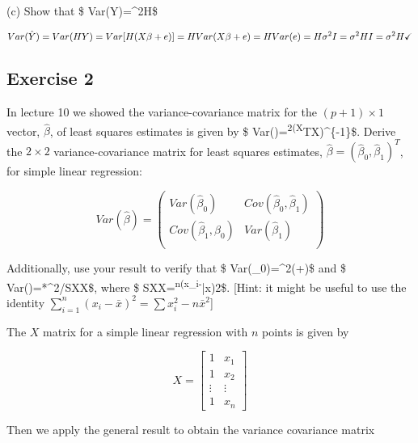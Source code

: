 \documentclass[
  letterpaper,
  DIV=11,
  numbers=noendperiod]{scrartcl}
\begin{document}
(c) Show that \$ Var(\hat Y)=\sigma\^{}2H\$

\[
 Var(\hat Y)= Var(HY)= Var[H(X\beta+e)] \\
=H  Var(X\beta+e) \\
=H  Var(e)\\
=H\sigma^2I \\
=\sigma^2HI \\
=\sigma^2H \checkmark
\]

\hypertarget{exercise-2}{%
\subsection{Exercise 2}\label{exercise-2}}

In lecture 10 we showed the variance-covariance matrix for the
\((p+1)\times1\) vector, \(\hat \beta\), of least squares estimates is
given by \$ Var(\hat \beta)=\sigma\textsuperscript{2(X}TX)\^{}\{-1\}\$.
Derive the \(2\times2\) variance-covariance matrix for least squares
estimates, \(\hat\beta=(\hat\beta_0,\hat\beta_1)^T\), for simple linear
regression:

\[
 Var(\hat\beta)= 
\begin{pmatrix}
 Var(\hat\beta_0) &  Cov(\hat\beta_0,\hat\beta_1) \\
 Cov(\hat\beta_1,\hat\beta_0) &  Var(\hat\beta_1) \\
\end{pmatrix}
\]

Additionally, use your result to verify that \$
Var(\hat\beta\_0)=\sigma\^{}2(+)\$ and \$
Var(\hat{})=*\sigma\^{}2/SXX\$, where \$
SXX=\textsuperscript{n(x\_i-}\bar x)2\$. {[}Hint: it might be
useful to use the identity
\(\sum_{i=1}^n(x_i-\bar x)^2=\sum x_i^2-n\bar x^2\){]}

The \(X\) matrix for a simple linear regression with \(n\) points is
given by

\[
X=
\begin{bmatrix} 
1 & x_1 \\
1 & x_2 \\
\vdots & \vdots \\
1 & x_n
\end{bmatrix}
\]

Then we apply the general result to obtain the variance covariance
matrix
\end{document}
